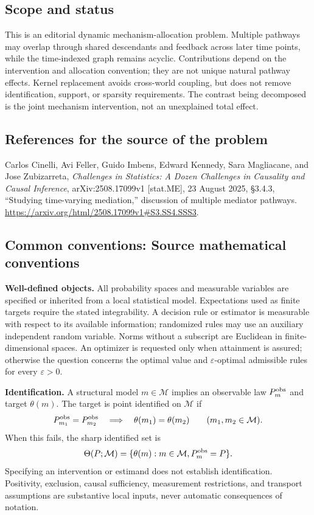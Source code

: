\documentclass[11pt,a4paper]{article}
\begin{document}
\subsection*{Scope and status}
This is an editorial dynamic mechanism-allocation problem. Multiple pathways may overlap through shared descendants and feedback across later time points, while the time-indexed graph remains acyclic. Contributions depend on the intervention and allocation convention; they are not unique natural pathway effects. Kernel replacement avoids cross-world coupling, but does not remove identification, support, or sparsity requirements. The contrast being decomposed is the joint mechanism intervention, not an unexplained total effect.
\subsection*{References for the source of the problem}
Carlos Cinelli, Avi Feller, Guido Imbens, Edward Kennedy, Sara Magliacane, and Jose Zubizarreta, \emph{Challenges in Statistics: A Dozen Challenges in Causality and Causal Inference}, arXiv:2508.17099v1 [stat.ME], 23 August 2025, \S3.4.3, ``Studying time-varying mediation,'' discussion of multiple mediator pathways. \url{https://arxiv.org/html/2508.17099v1#S3.SS4.SSS3}.

\subsection*{Common conventions: Source mathematical conventions}

\textbf{Well-defined objects.}
All probability spaces and measurable variables are specified or inherited
from a local statistical model. Expectations used as finite targets require
the stated integrability. A decision rule or estimator is measurable with
respect to its available information; randomized rules may use an auxiliary
independent random variable. Norms without a subscript are Euclidean in
finite-dimensional spaces. An optimizer is requested only when attainment
is assured; otherwise the question concerns the optimal value and
$\varepsilon$-optimal admissible rules for every $\varepsilon>0$.

\textbf{Identification.}
A structural model $m\in\mathcal M$ implies an observable law
$P_m^{\rm obs}$ and target $\theta(m)$. The target is point identified on
$\mathcal M$ if
\[
 P_{m_1}^{\rm obs}=P_{m_2}^{\rm obs}
 \quad\Longrightarrow\quad\theta(m_1)=\theta(m_2)
 \qquad(m_1,m_2\in\mathcal M).
\]
When this fails, the sharp identified set is
\[
 \Theta(P;\mathcal M)=\{\theta(m):m\in\mathcal M,
                                  P_m^{\rm obs}=P\}.
\]
Specifying an intervention or estimand does not establish identification.
Positivity, exclusion, causal sufficiency, measurement restrictions, and
transport assumptions are substantive local inputs, never automatic
consequences of notation.
\end{document}
